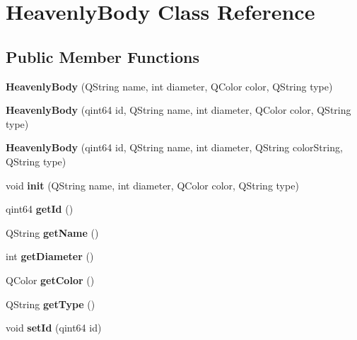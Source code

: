\section{\-Heavenly\-Body \-Class \-Reference}
\label{d0/dd5/classHeavenlyBody}
\subsection*{\-Public \-Member \-Functions}
\begin{DoxyCompactItemize}
\item 
{\bfseries \-Heavenly\-Body} (\-Q\-String name, int diameter, \-Q\-Color color, \-Q\-String type)\label{d0/dd5/classHeavenlyBody_a15e90e5466a9f4b56f26e1a89b473834}

\item 
{\bfseries \-Heavenly\-Body} (qint64 id, \-Q\-String name, int diameter, \-Q\-Color color, \-Q\-String type)\label{d0/dd5/classHeavenlyBody_abc558dad2d83c2fc1e6dbb268c15b722}

\item 
{\bfseries \-Heavenly\-Body} (qint64 id, \-Q\-String name, int diameter, \-Q\-String color\-String, \-Q\-String type)\label{d0/dd5/classHeavenlyBody_a9f2a1dc813ae718379fce83467239547}

\item 
void {\bfseries init} (\-Q\-String name, int diameter, \-Q\-Color color, \-Q\-String type)\label{d0/dd5/classHeavenlyBody_acaa58181b7c2fd1067e4752831c0a5c8}

\item 
qint64 {\bfseries get\-Id} ()\label{d0/dd5/classHeavenlyBody_a8cd3d97f94b35a2e783ecc046106ca78}

\item 
\-Q\-String {\bfseries get\-Name} ()\label{d0/dd5/classHeavenlyBody_aae80e4f1c9137c9b2e6b347922dceda9}

\item 
int {\bfseries get\-Diameter} ()\label{d0/dd5/classHeavenlyBody_ad651361998ff71d6d6920f5eb2702096}

\item 
\-Q\-Color {\bfseries get\-Color} ()\label{d0/dd5/classHeavenlyBody_aa1c57765937f0f168833419750cb4eb3}

\item 
\-Q\-String {\bfseries get\-Type} ()\label{d0/dd5/classHeavenlyBody_a394c8fd1124731237b6738bb395fb705}

\item 
void {\bfseries set\-Id} (qint64 id)\label{d0/dd5/classHeavenlyBody_a4840f293abcba420f954f969d8de26d9}


\end{DoxyCompactItemize}
